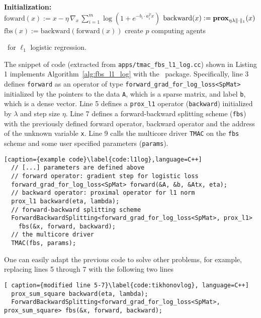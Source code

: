 \begin{algorithm}[H]\label{alg:fbs_l1_log}
\DontPrintSemicolon
  \textbf{Initialization:} \\
  \quad $\text{foward}(x) := x - \eta \, \nabla_x \,\sum_{i = 1}^m \log (1 + e^{-b_i \cdot a_i^T x})$  
  \quad $\text{backward}(x) := \mathbf{prox}_{\eta \lambda  \|\cdot\|_1} (x)$ 
  \quad $\text{fbs}(x) := \text{backward}(\text{forward}(x))$ 
  \quad create $p$ computing agents \\
  \caption{\pkg~for $\ell_1$ logistic regression.}
\end{algorithm}
The snippet of code (extracted from
\texttt{apps/tmac\_fbs\_l1\_log.cc}) shown in Listing 1 implements Algorithm~\ref{alg:fbs_l1_log} with the \pkg~package.
Specifically, line 3 defines \texttt{forward} as an operator of type \texttt{forward\_grad\_for\_log\_loss<SpMat>}
initialized by the pointers to the data \texttt{A}, which is a sparse matrix, and label \texttt{b}, which is a dense vector. Line 5  defines a
\texttt{prox\_l1} operator (\texttt{backward}) initialized by $\lambda$ and step size $\eta$.
Line 7 defines a forward-backward splitting scheme (\texttt{fbs}) with the previously defined forward operator,
backward operator and the address of the unknown variable \texttt{x}. Line 9 calls the multicore driver
\texttt{TMAC} on the \texttt{fbs} scheme and some user specified parameters (\texttt{params}).
\begin{lstlisting}[caption={example code}\label{code:l1log},language=C++]
  // [...] parameters are defined above
  // forward operator: gradient step for logistic loss
  forward_grad_for_log_loss<SpMat> forward(&A, &b, &Atx, eta);
  // backward operator: proximal operator for l1 norm
  prox_l1 backward(eta, lambda);
  // forward-backward splitting scheme
  ForwardBackwardSplitting<forward_grad_for_log_loss<SpMat>, prox_l1>
    fbs(&x, forward, backward);
  // the multicore driver
  TMAC(fbs, params);
\end{lstlisting}
One can easily adapt the previous code to solve other problems, for example, replacing lines 5 through 7 with
the following two lines
\begin{lstlisting}[ caption={modified line 5-7}\label{code:tikhonovlog}, language=C++]
  prox_sum_square backward(eta, lambda);
  ForwardBackwardSplitting<forward_grad_for_log_loss<SpMat>, prox_sum_square> fbs(&x, forward, backward);
\end{lstlisting}
